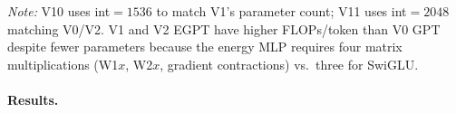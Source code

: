 \documentclass[11pt,a4paper]{article}
\begin{document}
\begin{table}[h]
\centering
\caption{Architecture and compute for the iso-family comparison.
  FLOPs/token = forward pass, $s{=}4096$, including attention kernel.
  Non-recurrent (12$\times$1) and recurrent (6$\times$2) families both apply
  12 block computations per token.}
\label{tab:mixed_arch}
\end{table}

\noindent\textit{Note:} V10 uses int$=1536$ to match V1's parameter count; V11 uses int$=2048$
matching V0/V2.  V1 and V2 EGPT have higher FLOPs/token than V0 GPT despite fewer parameters
because the energy MLP requires four matrix multiplications (W1$x$, W2$x$, gradient contractions)
vs.\ three for SwiGLU.

\paragraph{Results.}
\end{document}
